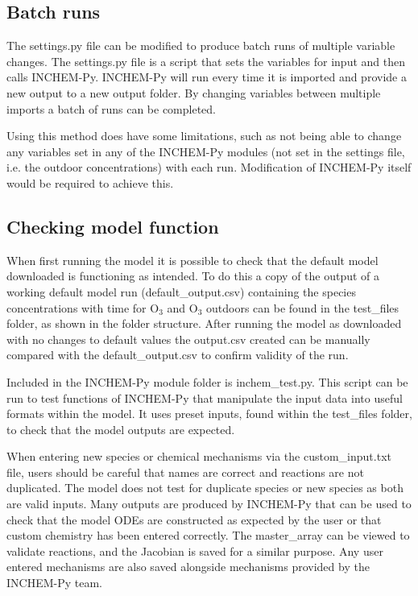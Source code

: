 \documentclass[a4paper]{refart}
\begin{document}
\subsection{Batch runs}
The settings.py file can be modified to produce batch runs of multiple variable changes. The settings.py file is a script that sets the variables for input and then calls INCHEM-Py. INCHEM-Py will run every time it is imported and provide a new output to a new output folder. By changing variables between multiple imports a batch of runs can be completed. 

Using this method does have some limitations, such as not being able to change any variables set in any of the INCHEM-Py modules (not set in the settings file, i.e. the outdoor concentrations) with each run. Modification of INCHEM-Py itself would be required to achieve this.

\subsection{Checking model function}
When first running the model it is possible to check that the default model downloaded is functioning as intended. To do this a copy of the output of a working default model run (default\_output.csv) containing the species concentrations with time for O$_3$ and O$_3$ outdoors can be found in the test\_files folder, as shown in the folder structure. After running the model as downloaded with no changes to default values the output.csv created can be manually compared with the default\_output.csv to confirm validity of the run.

Included in the INCHEM-Py module folder is inchem\_test.py. This script can be run to test functions of INCHEM-Py that manipulate the input data into useful formats within the model. It uses preset inputs, found within the test\_files folder, to check that the model outputs are expected.

When entering new species or chemical mechanisms via the custom\_input.txt file, users should be careful that names are correct and reactions are not duplicated. The model does not test for duplicate species or new species as both are valid inputs. Many outputs are produced by INCHEM-Py that can be used to check that the model ODEs are constructed as expected by the user or that custom chemistry has been entered correctly. The master\_array can be viewed to validate reactions, and the Jacobian is saved for a similar purpose. Any user entered mechanisms are also saved alongside mechanisms provided by the INCHEM-Py team.
\end{document}
